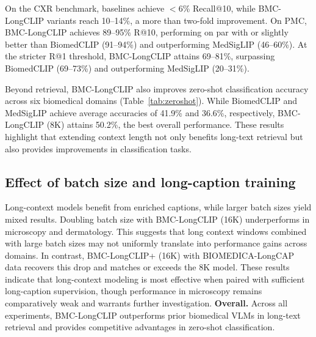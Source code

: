 On the CXR benchmark, baselines achieve $<$6\% Recall@10, while BMC-LongCLIP variants reach 10–14\%, a more than two-fold improvement. 
On PMC, BMC-LongCLIP achieves 89–95\% R@10, performing on par with or slightly better than BiomedCLIP (91–94\%) and outperforming MedSigLIP (46–60\%). At the stricter R@1 threshold, BMC-LongCLIP attains 69–81\%, surpassing BiomedCLIP (69–73\%) and outperforming MedSigLIP (20–31\%).







Beyond retrieval, BMC-LongCLIP also improves zero-shot classification accuracy across six biomedical domains (Table~\ref{tab:zeroshot}). 
While BiomedCLIP and MedSigLIP achieve average accuracies of 41.9\% and 36.6\%, respectively, BMC-LongCLIP (8K) attains 50.2\%, the best overall performance. 
These results highlight that extending context length not only benefits long-text retrieval but also provides improvements in classification tasks.

\subsection{Effect of batch size and long-caption training} Long-context models benefit from enriched captions, while larger batch sizes yield mixed results. Doubling batch size with BMC-LongCLIP (16K) underperforms in microscopy and dermatology. This suggests that long context windows combined with large batch sizes may not uniformly translate into performance gains across domains. In contrast, BMC-LongCLIP+ (16K) with BIOMEDICA-LongCAP data recovers this drop and matches or exceeds the 8K model. These results indicate that long-context modeling is most effective when paired with sufficient long-caption supervision, though performance in microscopy remains comparatively weak and warrants further investigation.
\noindent \textbf{Overall.} 
Across all experiments, BMC-LongCLIP outperforms prior biomedical VLMs in long-text retrieval and provides competitive advantages in zero-shot classification.